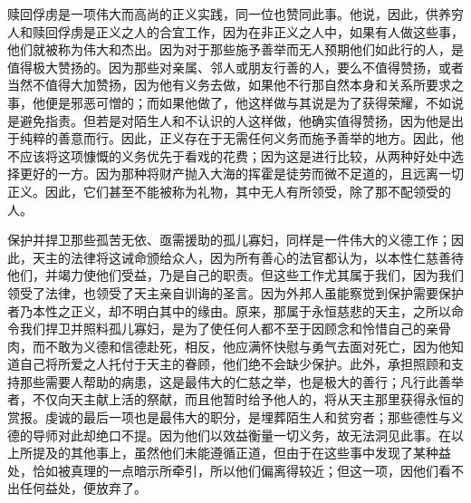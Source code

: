 赎回俘虏是一项伟大而高尚的正义实践，同一位也赞同此事。他说，因此，供养穷人和赎回俘虏是正义之人的合宜工作，因为在非正义之人中，如果有人做这些事，他们就被称为伟大和杰出。因为对于那些施予善举而无人预期他们如此行的人，是值得极大赞扬的。因为那些对亲属、邻人或朋友行善的人，要么不值得赞扬，或者当然不值得大加赞扬，因为他有义务去做，如果他不行那自然本身和关系所要求之事，他便是邪恶可憎的；而如果他做了，他这样做与其说是为了获得荣耀，不如说是避免指责。但若是对陌生人和不认识的人这样做，他确实值得赞扬，因为他是出于纯粹的善意而行。因此，正义存在于无需任何义务而施予善举的地方。因此，他不应该将这项慷慨的义务优先于看戏的花费；因为这是进行比较，从两种好处中选择更好的一方。因为那种将财产抛入大海的挥霍是徒劳而微不足道的，且远离一切正义。因此，它们甚至不能被称为礼物，其中无人有所领受，除了那不配领受的人。\par

保护并捍卫那些孤苦无依、亟需援助的孤儿寡妇，同样是一件伟大的义德工作；因此，天主的法律将这诫命颁给众人，因为所有善心的法官都认为，以本性仁慈善待他们，并竭力使他们受益，乃是自己的职责。但这些工作尤其属于我们，因为我们领受了法律，也领受了天主亲自训诲的圣言。因为外邦人虽能察觉到保护需要保护者乃本性之正义，却不明白其中的缘由。原来，那属于永恒慈悲的天主，之所以命令我们捍卫并照料孤儿寡妇，是为了使任何人都不至于因顾念和怜惜自己的亲骨肉，而不敢为义德和信德赴死，相反，他应满怀快慰与勇气去面对死亡，因为他知道自己将所爱之人托付于天主的眷顾，他们绝不会缺少保护。此外，承担照顾和支持那些需要人帮助的病患，这是最伟大的仁慈之举，也是极大的善行；凡行此善举者，不仅向天主献上活的祭献，而且他暂时给予他人的，将从天主那里获得永恒的赏报。虔诚的最后一项也是最伟大的职分，是埋葬陌生人和贫穷者；那些德性与义德的导师对此却绝口不提。因为他们以效益衡量一切义务，故无法洞见此事。在以上所提及的其他事上，虽然他们未能遵循正道，但由于在这些事中发现了某种益处，恰如被真理的一点暗示所牵引，所以他们偏离得较近；但这一项，因他们看不出任何益处，便放弃了。\par

